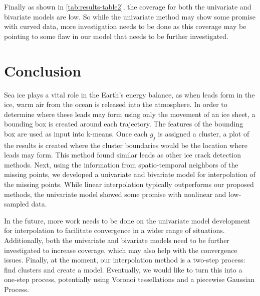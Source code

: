 \documentclass[12pt]{article}
\begin{document}
Finally as shown in \cref{tab:results-table2}, the coverage for both the
univariate and bivariate models are low. So while the univariate method
may show some promise with curved data, more investigation needs to be
done as this coverage may be pointing to some flaw in our model that
needs to be further investigated.

\hypertarget{conclusion}{%
\section{Conclusion}\label{conclusion}}

Sea ice plays a vital role in the Earth's energy balance, as when leads
form in the ice, warm air from the ocean is released into the
atmosphere. In order to determine where these leads may form using only
the movement of an ice sheet, a bounding box is created around each
trajectory. The features of the bounding box are used as input into
k-means. Once each \(g_j\) is assigned a cluster, a plot of the results
is created where the cluster boundaries would be the location where
leads may form. This method found similar leads as other ice crack
detection methods. Next, using the information from spatio-temporal
neighbors of the missing points, we developed a univariate and bivariate
model for interpolation of the missing points. While linear
interpolation typically outperforms our proposed methods, the univariate
model showed some promise with nonlinear and low-sampled data.

In the future, more work needs to be done on the univariate model
development for interpolation to facilitate convergence in a wider range
of situations. Additionally, both the univariate and bivariate models
need to be further investigated to increase coverage, which may also
help with the convergence issues. Finally, at the moment, our
interpolation method is a two-step process: find clusters and create a
model. Eventually, we would like to turn this into a one-step process,
potentially using Voronoi tessellations and a piecewise Gaussian
Process.



\end{document}
